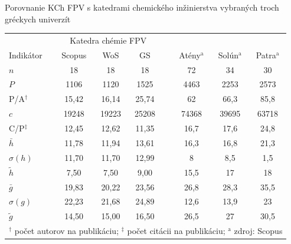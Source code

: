 \documentclass{beamer}
\begin{document}
%
%
\begin{frame}{Porovnanie KCh FPV s katedrami chemického inžinierstva vybraných troch gréckych univerzít}
  \begin{table}
    \footnotesize
    \begin{tabular}{lccclccc}
      \toprule
      & \multicolumn{3}{c}{Katedra chémie FPV} & & \multicolumn{3}{c}{\citet{Kazakis2015}} \\
      \cmidrule{2-4}\cmidrule{6-8}
      Indikátor & Scopus & WoS & GS & & Atény$^{\mathrm{a}}$ & Solún$^{\mathrm{a}}$ & Patra$^{\mathrm{a}}$ \\
      \midrule
      $n$            & 18    & 18    & 18    & & 72    & 34    & 30    \\
      $P$            & 1106  & 1120  & 1525  & & 4463  & 2253  & 2573  \\
      P/A$^\dagger$  & 15,42 & 16,14 & 25,74 & & 62    & 66,3  & 85,8  \\
      $c$            & 19248 & 19223 & 25208 & & 74368 & 39695 & 63718 \\
      C/P$^\ddagger$ & 12,45 & 12,62 & 11,35 & & 16,7  & 17,6  & 24,8  \\
      $\bar{h}$      & 11,78 & 11,94 & 13,61 & & 16,3  & 16,8  & 21,3  \\
      $\sigma (h)$   & 11,70 & 11,70 & 12,99 & & 8     & 8,5   & 1,5   \\
      $\tilde{h}$    & 7,50  & 7,50  & 9,00  & & 15,5  & 17    & 18    \\
      $\bar{g}$      & 19,83 & 20,22 & 23,56 & & 26,8  & 28,3  & 35,5  \\
      $\sigma (g)$   & 22,23 & 21,68 & 24,89 & & 12,6  & 13,9  & 23    \\
      $\tilde{g}$    & 14,50 & 15,00 & 16,50 & & 26,5  & 27    & 30,5  \\
      \bottomrule
      \multicolumn{8}{l}{\tiny $^\dagger$ počet autorov na publikáciu; $^\ddagger$ počet citácii na publikáciu; $^{\mathrm{a}}$ zdroj: Scopus}
    \end{tabular}
  \end{table}
\end{frame}
\end{document}
